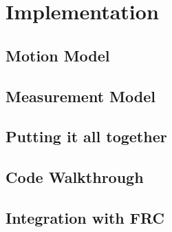 \documentclass{scrartcl}
\begin{document}
\newpage
\section{Implementation}
\subsection{Motion Model}
\subsection{Measurement Model}
\subsection{Putting it all together}
\subsection{Code Walkthrough}
\subsection{Integration with FRC}
\end{document}
